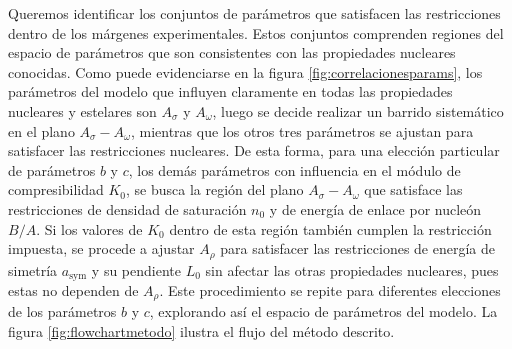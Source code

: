Queremos identificar los conjuntos de parámetros que satisfacen las restricciones dentro de los márgenes experimentales. Estos conjuntos comprenden regiones del espacio de parámetros que son consistentes con las propiedades nucleares conocidas. Como puede evidenciarse en la figura \ref{fig:correlacionesparams}, los parámetros del modelo que influyen claramente en todas las propiedades nucleares y estelares son $A_\sigma$ y $A_\omega$, luego se decide realizar un barrido sistemático en el plano $A_\sigma - A_\omega$, mientras que los otros tres parámetros se ajustan para satisfacer las restricciones nucleares. De esta forma, para una elección particular de parámetros $b$ y $c$, los demás parámetros con influencia en el módulo de compresibilidad $K_0$, se busca la región del plano $A_\sigma - A_\omega$ que satisface las restricciones de densidad de saturación $n_0$ y de energía de enlace por nucleón $B/A$. Si los valores de $K_0$ dentro de esta región también cumplen la restricción impuesta, se procede a ajustar $A_\rho$ para satisfacer las restricciones de energía de simetría $a_\text{sym}$ y su pendiente $L_0$ sin afectar las otras propiedades nucleares, pues estas no dependen de $A_\rho$. Este procedimiento se repite para diferentes elecciones de los parámetros $b$ y $c$, explorando así el espacio de parámetros del modelo. La figura \ref{fig:flowchartmetodo} ilustra el flujo del método descrito. 



